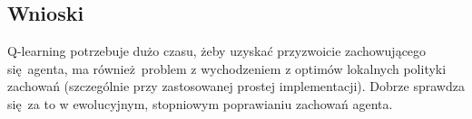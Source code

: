 \subsection{Wnioski}
Q-learning potrzebuje dużo czasu, żeby uzyskać przyzwoicie zachowującego się agenta, ma również problem z wychodzeniem z optimów lokalnych polityki zachowań (szczególnie przy zastosowanej prostej implementacji). Dobrze sprawdza się za to w ewolucyjnym, stopniowym poprawianiu zachowań agenta.
